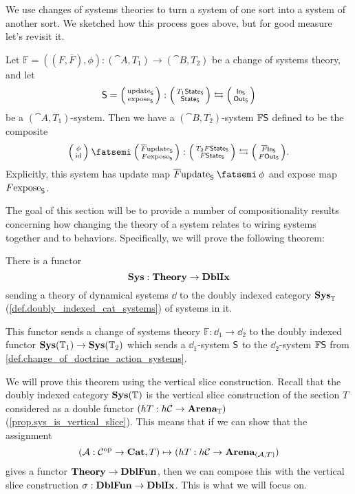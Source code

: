 \documentclass[DynamicalBook]{subfiles}
\begin{document}
We use changes of systems theories to turn a system of one sort into a system of
another sort. We sketched how this process goes above, but for good measure
let's revisit it.
\begin{definition}\label{def.change_of_doctrine_action_systems}
Let $\mathbb{F} = ((F, \overline{F}), \phi) : (\cat{A}, T_1) \to (\cat{B}, T_2)$ be a change of systems theory, and
let
\[
\Sys{S} = \lens{\update{S}}{\expose{S}} : \lens{T_1\State{S}}{\State{S}} \fromto \lens{\In{S}}{\Out{S}}
\]
be a $(\cat{A}, T_1)$-system. Then we have a $(\cat{B}, T_2)$-system $\mathbb{F}
\mathsf{S}$ defined to
be the composite 
\[
\lens{\phi}{\id} \then \lens{\overline{F}\update{S}}{F\expose{S}} : \lens{T_2F\State{S}}{F\State{S}} \fromto \lens{\overline{F}\In{S}}{F\Out{S}}.
\]
Explicitly, this system has update map $\overline{F} \update{S} \then \phi$ and
expose map $F\mathrm{expose}_{\mathsf{S}}$.
\end{definition}

The goal of this section will be to provide a number of compositionality results
concerning how changing the theory of a system relates to wiring systems
together and to behaviors. Specifically, we will prove the following theorem:
\begin{theorem}\label{thm.functoriality_system_construction}
  There is a functor 
\[
\textbf{Sys} : \textbf{Theory} \to \textbf{DblIx}
\]
sending a theory of dynamical systems $\dd$ to the doubly indexed category
$\textbf{Sys}_{\mathbb{T}}$ (\cref{def.doubly_indexed_cat_systems}) of systems in it. 

This functor sends a change of systems theory $\mathbb{F} : \dd_1 \to \dd_2$ to the doubly indexed functor $\textbf{Sys}(\mathbb{T}_1)
\to \textbf{Sys}(\mathbb{T}_2)$ which sends a $\dd_1$-system $\mathsf{S}$ to the
$\dd_2$-system $\mathbb{F}\mathsf{S}$ from \cref{def.change_of_doctrine_action_systems}.
\end{theorem}

We will prove this theorem using the vertical slice construction. Recall that
the doubly indexed category $\textbf{Sys}(\mathbb{T})$ is the vertical slice construction
of the section $T$ considered as a double functor $(hT : h\mathcal{C} \to
\textbf{Arena}_{\mathbb{T}})$ (\cref{prop.sys_is_vertical_slice}). This means that if we
can show that the assignment 
\[
(\mathcal{A} : \mathcal{C}^{\textnormal{op}} \to \textbf{Cat}, T) \mapsto (hT : h\mathcal{C} \to
\textbf{Arena}_{(\mathcal{A}, T)})
\]
gives a functor $\textbf{Theory} \to \textbf{DblFun}$, then we can compose this with
the vertical slice construction $\sigma : \textbf{DblFun} \to \textbf{DblIx}$. This is
what we will focus on.
\end{document}
